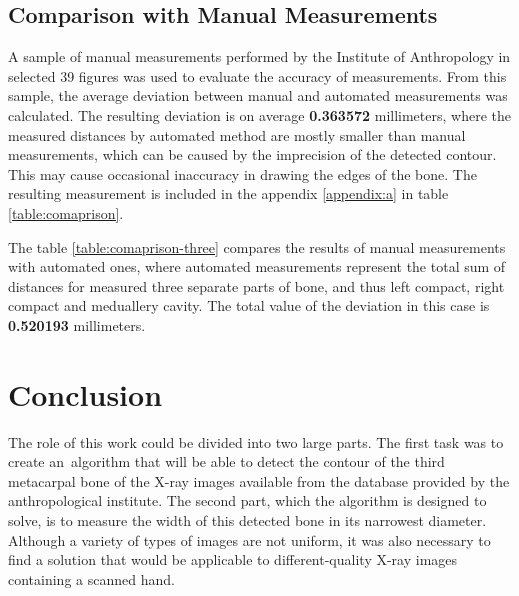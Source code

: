 \section{Comparison with Manual Measurements}
A sample of manual measurements performed by the Institute of Anthropology in selected 39 figures was used to evaluate the accuracy of measurements. From this sample, the average deviation between manual and automated measurements was calculated. The resulting deviation is on average \textbf{0.363572} millimeters, where the measured distances by automated method are mostly smaller than manual measurements, which can be caused by the imprecision of the detected contour. This may cause occasional inaccuracy in drawing the edges of the bone. The resulting measurement is included in the appendix \ref{appendix:a} in table \ref{table:comaprison}.

The table \ref{table:comaprison-three} compares the results of manual measurements with automated ones, where automated measurements represent the total sum of distances for measured three separate parts of bone, and thus left compact, right compact and meduallery cavity. The total value of the deviation in this case is \textbf{0.520193} millimeters. 


\chapter{Conclusion}
\label{conclusion}
The role of this work could be divided into two large parts. The first task was to create an~algorithm that will be able to detect the contour of the third metacarpal bone of the X-ray images available from the database provided by the anthropological institute. The second part, which the algorithm is designed to solve, is to measure the width of this detected bone in its narrowest diameter. Although a variety of types of images are not uniform, it was also necessary to find a solution that would be applicable to different-quality X-ray images containing a scanned hand.

